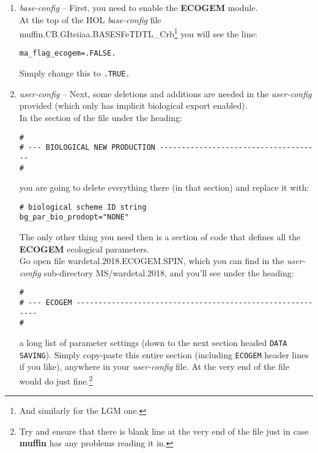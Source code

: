 \documentclass[11pt,fleqn]{book} %
\begin{document}
\begin{enumerate}[noitemsep]

\vspace{1mm}
\item \textit{base-config} -- First, you need to enable the \textbf{ECOGEM} module.
\\At the top of the HOL \textit{base-config} file \textsf{\footnotesize muffin.CB.GIteiiaa.BASESFeTDTL\_Crb}\footnote{And similarly for the LGM one.} you will see the line:
\vspace{-2mm}\begin{verbatim}
ma_flag_ecogem=.FALSE.
\end{verbatim}\vspace{-2mm}
Simply change this to \texttt{.TRUE.}
\vspace{6mm}
\pagebreak

\vspace{1mm}
\item \textit{user-config} -- Next, some deletions and additions are needed in the \textit{user-config} provided (which only has implicit biological export enabled).
\\In the section of the file under the heading:
\footnotesize\begin{verbatim}
#
# --- BIOLOGICAL NEW PRODUCTION -------------------------------------
#
\end{verbatim}\normalsize
you are going to delete everything there (in that section) and replace it with:
\vspace{-1mm}\begin{verbatim}
# biological scheme ID string
bg_par_bio_prodopt="NONE"
\end{verbatim}\vspace{-1mm}
The only other thing you need then is a section of code that defines all the \textbf{ECOGEM} ecological parameters.
\\ Go open file \textsf{\footnotesize wardetal.2018.ECOGEM.SPIN}, which you can find in the \textit{user-config} sub-directory \textsf{\footnotesize MS/wardetal.2018}, and you'll see under the heading:
\footnotesize\begin{verbatim}
#
# --- ECOGEM ----------------------------------------------------------
#
\end{verbatim}\normalsize
a long list of parameter settings (down to the next section headed \texttt{DATA SAVING}). Simply copy-paste this entire section (including \texttt{ECOGEM} header lines if you like), anywhere in your \textit{user-config} file. At the very end of the file would do just fine.\footnote{Try and ensure that there is blank line at the very end of the file just in case \textbf{muffin} has any problems reading it in.}


\end{enumerate}
\end{document}
